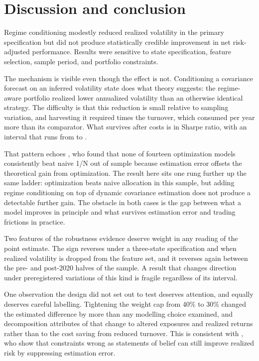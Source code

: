 \documentclass[11pt,letterpaper]{article}
\begin{document}


\section{Discussion and conclusion}
\label{sec:conclusion}

Regime conditioning modestly reduced realized volatility in the primary
specification but did not produce statistically credible improvement in
net risk-adjusted performance. Results were sensitive to state
specification, feature selection, sample period, and portfolio
constraints.

The mechanism is visible even though the effect is not. Conditioning a
covariance forecast on an inferred volatility state does what theory
suggests: the regime-aware portfolio realized \volDifferenceMagnitude{}
lower annualized volatility than an otherwise identical strategy. The
difficulty is that this reduction is small relative to sampling
variation, and harvesting it required \turnoverRatio{} times the
turnover, which consumed \costHurdle{} per year more than its comparator.
What survives after costs is
\primarySharpeDiff{} in Sharpe ratio, with an interval that runs from
\primaryCiLower{} to \primaryCiUpper{}.

That pattern echoes \citet{demiguel2009}, who found that none of
fourteen optimization models consistently beat naive 1/N out of sample
because estimation error offsets the theoretical gain from
optimization. The result here sits one rung further up the same ladder:
optimization beats naive allocation in this sample, but adding regime
conditioning on top of dynamic covariance estimation does not produce a
detectable further gain. The obstacle in both cases is the gap between
what a model improves in principle and what survives estimation error
and trading frictions in practice.

Two features of the robustness evidence deserve weight in any reading of
the point estimate. The sign reverses under a three-state specification
and when realized volatility is dropped from the feature set, and it
reverses again between the pre- and post-2020 halves of the sample. A
result that changes direction under preregistered variations of this
kind is fragile regardless of its interval.

One observation the design did not set out to test deserves attention,
and equally deserves careful labelling. Tightening the weight cap from
40\% to 30\% changed the estimated difference by more than any modelling
choice examined, and decomposition attributes \capThirtyGrossShare{} of
that change to altered exposures and realized returns rather than to the
cost saving from reduced turnover. This is consistent with
\citet{jagannathan2003}, who show that constraints wrong as statements
of belief can still improve realized risk by suppressing estimation
error.
\end{document}
